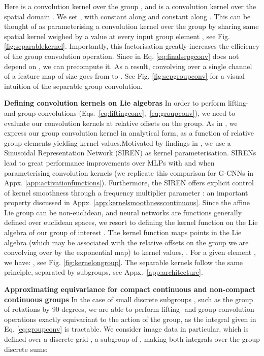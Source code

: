 \documentclass[nohyperref]{article}
\theoremstyle{plain}
\theoremstyle{definition}
\theoremstyle{remark}
\begin{document}
Here  is a convolution kernel over the group , and  is a convolution kernel over the spatial domain . We set , with  constant along  and  constant along . This can be thought of as parameterising a convolution kernel  over the group  by sharing same spatial kernel  weighed by a value  at every input group element , see Fig. \ref{fig:separablekernel}. Importantly, this factorisation greatly increases the efficiency of the group convolution operation. Since  in Eq. \ref{eq:finalsepgconv} does not depend on , we can precompute it. As a result, convolving over a single channel of a feature map  of size  goes from  to . See Fig. \ref{fig:sepgroupconv} for a visual intuition of the separable group convolution.

\textbf{Defining convolution kernels on Lie algebras} In order to perform lifting- and group convolutions (Eqs.~\ref{eq:liftingconv},~\ref{eq:groupconv}), we need to evaluate our convolution kernels  at relative offsets  on the group. As in \citet{bekkers2017template,weiler2018learning,bekkers2019b, finzi2020generalizing}, we express our group convolution kernel  in analytical form, as a function of relative group elements yielding kernel values.\break Motivated by findings in \citet{romero2021ckconv}, we use a Sinusoidal Representation Network (SIREN) \citep{sitzmann2020implicit} as kernel parameterisation. SIRENs lead to great performance improvements over MLPs with  and  when parameterising convolution kernels (we replicate this comparison for G-CNNs in Appx. \ref{app:activationfunctions}). Furthermore, the SIREN offers explicit control of kernel smoothness through a frequency multiplier parameter : an important property discussed in Appx. \ref{app:kernelsmoothnesscontinuous}. Since the affine Lie group can be non-euclidean, and neural networks are functions generally defined over euclidean spaces, we resort to defining the kernel function on the Lie algebra of our group of interest \citep{bekkers2019b,finzi2020generalizing}. The kernel function  maps points in the Lie algebra (which may be associated with the relative offsets on the group we are convolving over by the exponential map) to kernel values, . For a given element , we have: , see Fig. \ref{fig:kernelongroup}. The separable kernels follow the same principle, separated by subgroups, see Appx.~\ref{app:architecture}.

\textbf{Approximating equivariance for compact continuous and non-compact continuous groups} In the case of small discrete subgroups , such as the group  of rotations by 90 degrees, we are able to perform lifting- and group convolution operations exactly equivariant to the action of the group, as the integral given in Eq. \ref{eq:groupconv} is tractable. We consider image data in particular, which is defined over a discrete grid , a subgroup of , making both integrals over the group discrete sums:
\end{document}
